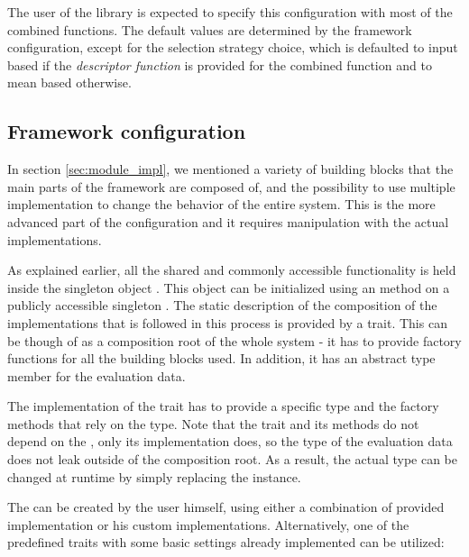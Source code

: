 The user of the library is expected to specify this configuration with most of the combined functions. The default values are determined by the framework configuration, except for the selection strategy choice, which is defaulted to input based if the \textit{descriptor function} is provided for the combined function and to mean based otherwise.


\subsection{Framework configuration}
\label{subsec:framework_config}

In section \ref{sec:module_impl}, we mentioned a variety of building blocks that the main parts of the framework are composed of, and the possibility to use multiple implementation to change the behavior of the entire system. This is the more advanced part of the configuration and it requires manipulation with the actual implementations.

As explained earlier, all the shared and commonly accessible functionality is held inside the singleton object . This object can be initialized using an  method on a publicly accessible singleton . The static description of the composition of the implementations that is followed in this process is provided by a  trait. This can be though of as a composition root of the whole system - it has to provide factory functions for all the building blocks used. In addition, it has an abstract type member  for the evaluation data. 


The implementation of the  trait has to provide a specific  type and the factory methods that rely on the type. Note that the  trait and its methods do not depend on the , only its implementation does, so the type of the evaluation data does not leak outside of the composition root. As a result, the actual type can be changed at runtime by simply replacing the  instance.

The  can be created by the user himself, using either a combination of provided implementation or his custom implementations. Alternatively, one of the predefined  traits with some basic settings already implemented can be utilized:

